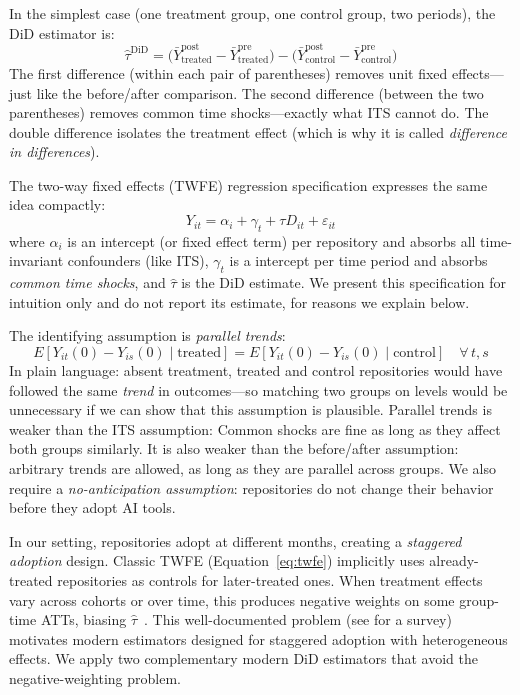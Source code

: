 In the simplest case (one treatment group, one control group, two periods), the DiD estimator is:
\begin{equation}
\label{eq:did-2x2}
\hat{\tau}^{\text{DiD}} = \bigl(\bar{Y}^{\text{post}}_{\text{treated}} - \bar{Y}^{\text{pre}}_{\text{treated}}\bigr) - \bigl(\bar{Y}^{\text{post}}_{\text{control}} - \bar{Y}^{\text{pre}}_{\text{control}}\bigr)
\end{equation}
The first difference (within each pair of parentheses) removes unit fixed effects---just like the before/after comparison.
The second difference (between the two parentheses) removes common time shocks---exactly what ITS cannot do.
The double difference isolates the treatment effect (which is why it is called \emph{difference in differences}).

The two-way fixed effects (TWFE) regression specification expresses the same idea compactly:
\begin{equation}
\label{eq:twfe}
Y_{it} = \alpha_i + \gamma_t + \tau D_{it} + \varepsilon_{it}
\end{equation}
where $\alpha_i$ is an intercept (or fixed effect term) per repository and absorbs all time-invariant confounders (like ITS), $\gamma_t$ is a intercept per time period and absorbs \emph{common time shocks}, and $\hat{\tau}$ is the DiD estimate.
We present this specification for intuition only and do not report its estimate, for reasons we explain below.

The identifying assumption is \emph{parallel trends}:
\begin{equation}
\label{eq:parallel-trends}
E[Y_{it}(0) - Y_{is}(0) \mid \text{treated}] = E[Y_{it}(0) - Y_{is}(0) \mid \text{control}] \quad \forall\, t, s
\end{equation}
In plain language: absent treatment, treated and control repositories would have followed the same \emph{trend} in outcomes---so matching two groups on levels would be unnecessary if we can show that this assumption is plausible.
Parallel trends is weaker than the ITS assumption: Common shocks are fine as long as they affect both groups similarly.
It is also weaker than the before/after assumption: arbitrary trends are allowed, as long as they are parallel across groups.
We also require a \emph{no-anticipation assumption}: repositories do not change their behavior before they adopt AI tools.

In our setting, repositories adopt at different months, creating a \emph{staggered adoption} design.
Classic TWFE (Equation~\ref{eq:twfe}) implicitly uses already-treated repositories as controls for later-treated ones.
When treatment effects vary across cohorts or over time, this produces negative weights on some group-time ATTs, biasing $\hat{\tau}$~\cite{goodman2021difference, dechaisemartin2020two}.
This well-documented problem (see \citet{roth2023whats} for a survey) motivates modern estimators designed for staggered adoption with heterogeneous effects.
We apply two complementary modern DiD estimators that avoid the negative-weighting problem.

